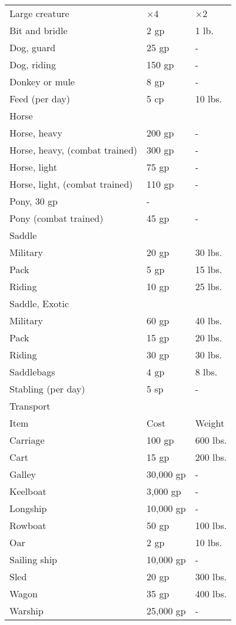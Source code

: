 \begin{xtabular}{lll}
 Large creature & $\times$4 & $\times$2 \\
 Bit and bridle & 2 gp & 1 lb. \\
 Dog, guard & 25 gp & - \\
 Dog, riding & 150 gp & - \\
 Donkey or mule & 8 gp & - \\
 Feed (per day) & 5 cp & 10 lbs. \\
 Horse  \\
 Horse, heavy & 200 gp & - \\
 Horse, heavy, (combat trained) & 300 gp & - \\
 Horse, light & 75 gp & - \\
 Horse, light, (combat trained) & 110 gp & - \\
 Pony, 30 gp & - \\
 Pony (combat trained) & 45 gp & - \\
 Saddle \\
 Military & 20 gp & 30 lbs. \\
 Pack & 5 gp & 15 lbs. \\
 Riding & 10 gp & 25 lbs. \\
 Saddle, Exotic  \\
 Military & 60 gp & 40 lbs. \\
 Pack & 15 gp & 20 lbs. \\
 Riding & 30 gp & 30 lbs. \\
 Saddlebags & 4 gp & 8 lbs. \\
 Stabling (per day) & 5 sp & -\\
Transport  \\
 Item & Cost & Weight\\
Carriage & 100 gp & 600 lbs. \\
 Cart & 15 gp & 200 lbs. \\
 Galley & 30,000 gp & - \\
 Keelboat & 3,000 gp & - \\
 Longship & 10,000 gp & - \\
 Rowboat & 50 gp & 100 lbs. \\
 Oar & 2 gp & 10 lbs. \\
 Sailing ship & 10,000 gp & - \\
 Sled & 20 gp & 300 lbs. \\
 Wagon & 35 gp & 400 lbs. \\
 Warship & 25,000 gp & -\\
 \end{xtabular}
